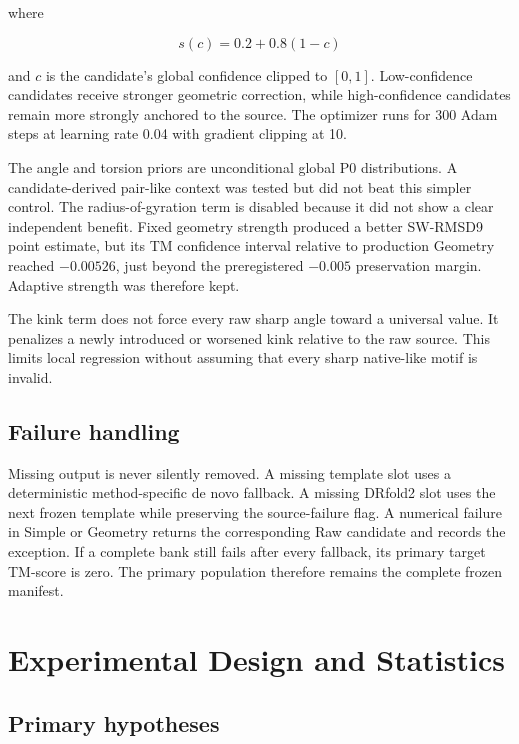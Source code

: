\documentclass[12pt,a4paper,oneside]{report}
\begin{document}
where

\begin{equation}
s(c)=0.2+0.8(1-c)
\end{equation}

and $c$ is the candidate's global confidence clipped to $[0,1]$. Low-confidence
candidates receive stronger geometric correction, while high-confidence candidates
remain more strongly anchored to the source. The optimizer runs for 300 Adam steps at
learning rate 0.04 with gradient clipping at 10.

The angle and torsion priors are unconditional global P0 distributions. A
candidate-derived pair-like context was tested but did not beat this simpler control.
The radius-of-gyration term is disabled because it did not show a clear independent
benefit. Fixed geometry strength produced a better SW-RMSD9 point estimate, but its TM
confidence interval relative to production Geometry reached $-0.00526$, just beyond
the preregistered $-0.005$ preservation margin. Adaptive strength was therefore kept.

The kink term does not force every raw sharp angle toward a universal value. It
penalizes a newly introduced or worsened kink relative to the raw source. This limits
local regression without assuming that every sharp native-like motif is invalid.

\section{Failure handling}

Missing output is never silently removed. A missing template slot uses a deterministic
method-specific de novo fallback. A missing DRfold2 slot uses the next frozen template
while preserving the source-failure flag. A numerical failure in Simple or Geometry
returns the corresponding Raw candidate and records the exception. If a complete bank
still fails after every fallback, its primary target TM-score is zero. The primary
population therefore remains the complete frozen manifest.

\chapter{Experimental Design and Statistics}

\section{Primary hypotheses}
\end{document}
